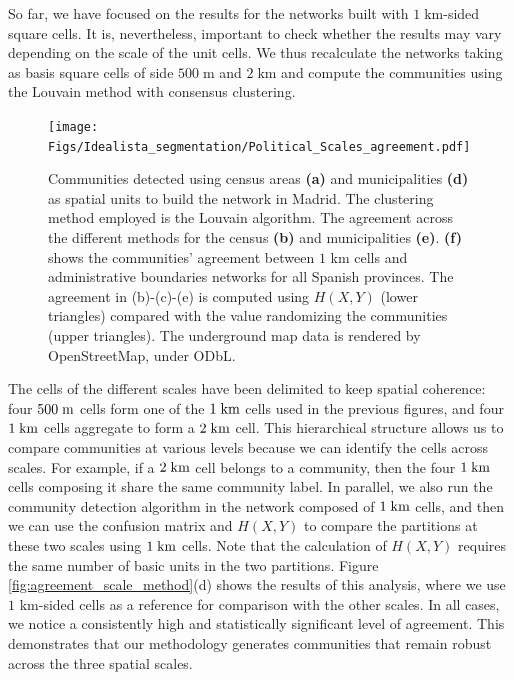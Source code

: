 So far, we have focused on the results for the networks built with $1 \; \textrm{km}$-sided square cells. It is, nevertheless, important to check whether the results may vary depending on the scale of the unit cells. We thus recalculate the networks taking as basis square cells of side $500 \; \textrm{m}$ and $2 \; \textrm{km}$ and compute the communities using the Louvain method with consensus clustering. 
\begin{figure}
    \label{fig:political_scales}
    \centering
    \texttt{[image: Figs/Idealista\_segmentation/Political\_Scales\_agreement.pdf]}
	\caption[Community detection from networks using administrative spatial units.]{ Communities detected using census areas \textbf{(a)} and municipalities \textbf{(d)} as spatial units to build the network in Madrid. The clustering method employed is the Louvain algorithm. The agreement across the different methods for the census \textbf{(b)} and municipalities \textbf{(e)}. \textbf{(f)} shows the communities' agreement between $1$ km cells and administrative boundaries networks for all Spanish provinces. The agreement in (b)-(c)-(e) is computed using $H(X,Y)$ (lower triangles) compared with the value randomizing the communities (upper triangles).  The underground map data is rendered by OpenStreetMap, under ODbL.}
\end{figure}
The cells of the different scales have been delimited to keep spatial coherence: four $500 \;\rm{m}$ cells form one of the $1  \;\rm{km}$ cells used in the previous figures, and four $1 \; \rm{km}$ cells aggregate to form a $2 \; \rm{km}$ cell. 
This hierarchical structure allows us to compare communities at various levels because we can identify the cells across scales. For example, if a $2 \;\rm{ km}$ cell belongs to a community, then the four $1 \;\rm{ km}$ cells composing it share the same community label.
In parallel, we also run the community detection algorithm in the network composed of $1 \; \rm{ km}$ cells, and then we can use the confusion matrix and $H(X,Y)$ to compare the partitions at these two scales using $1 \;\rm{ km}$ cells. Note that the calculation of $H(X,Y)$ requires the same number of basic units in the two partitions. Figure \ref{fig:agreement_scale_method}(d) shows the results of this analysis, where we use $1$ km-sided cells as a reference for comparison with the other scales. In all cases, we notice a consistently high and statistically significant level of agreement. This demonstrates that our methodology generates communities that remain robust across the three spatial scales.

